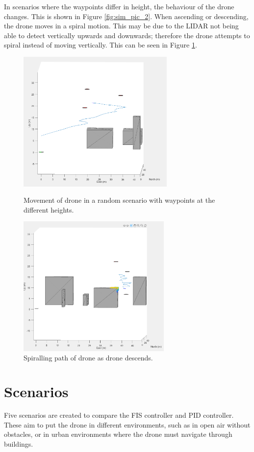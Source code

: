 In scenarios where the waypoints differ in height, the behaviour of the drone changes. This is shown in Figure \ref{fig:sim_pic_2}. When ascending or descending, the drone moves in a spiral motion. This may be due to the LIDAR not being able to detect vertically upwards and downwards; therefore the drone attempts to spiral instead of moving vertically. This can be seen in Figure \ref{fig:sim_pic_3}.
\begin{figure}[H]
    \centering
    \begin{minipage}[b]{0.45\textwidth}
        \includegraphics[height=7cm,keepaspectratio]{./img/sim_pic_2.png}
        \caption{Movement of drone in a random scenario with waypoints at the different heights.}
        \label{fig:sim_pic_2}
    \end{minipage}
    \hfill
    \begin{minipage}[b]{0.45\textwidth}
        \includegraphics[height=7cm,keepaspectratio]{./img/sim_pic_3.png}
        \caption{Spiralling path of drone as drone descends.}
        \label{fig:sim_pic_3}
    \end{minipage}
\end{figure}

\section{Scenarios}
Five scenarios are created to compare the FIS controller and PID controller. These aim to put the drone in different environments, such as in open air without obstacles, or in urban environments where the drone must navigate through buildings.

